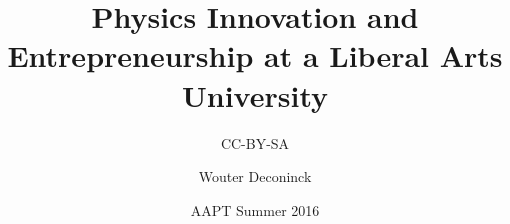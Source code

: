 \documentclass[xcolor=table,compress,professionalfonts,pdfpagelabels]{beamer}
\title{Physics Innovation and Entrepreneurship at a Liberal Arts University}
\subtitle{CC-BY-SA}
\author{Wouter Deconinck}
\institute{William \& Mary}
\date{AAPT Summer 2016}
\begin{document}
%


\begin{frame}[plain]
 \maketitle
\end{frame}
\end{document}

